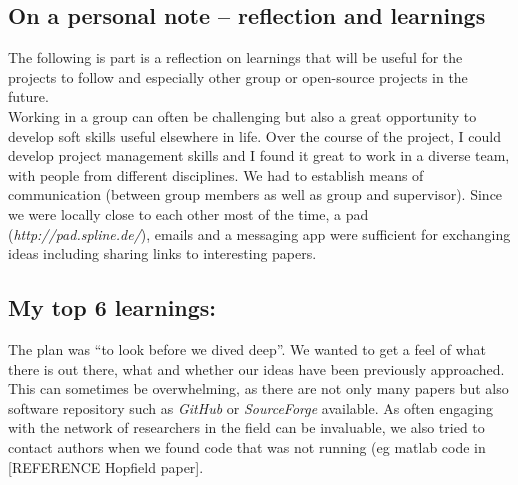 \documentclass[journal, a4paper]{IEEEtran}
\begin{document}



\subsection{\textbf{On a personal note -- reflection and learnings}}



The following is part is a reflection on learnings that will be useful for the projects to follow and especially other group or open-source projects in the future.\\


Working in a group can often be challenging but also a great opportunity to develop soft skills useful elsewhere in life. Over the course of the project, I could develop project management skills and I found it great to work in a diverse team, with people from different disciplines. 
We had to establish means of communication (between group members as well as group and supervisor). Since we were locally close to each other most of the time, a pad (\textit{http://pad.spline.de/}), emails and a messaging app were sufficient for exchanging ideas including sharing links to interesting papers.

\subsection{My top 6 learnings:}

The plan was “to look before we dived deep”. We wanted to get a feel of what there is out there, what and whether our ideas have been previously approached. This can sometimes be overwhelming, as there are not only many papers but also software repository such as \textit{GitHub} or \textit{SourceForge} available. As often engaging with the network of researchers in the field can be invaluable, we also tried to contact authors when we found code that was not running (eg matlab code in [REFERENCE Hopfield paper].
\end{document}
